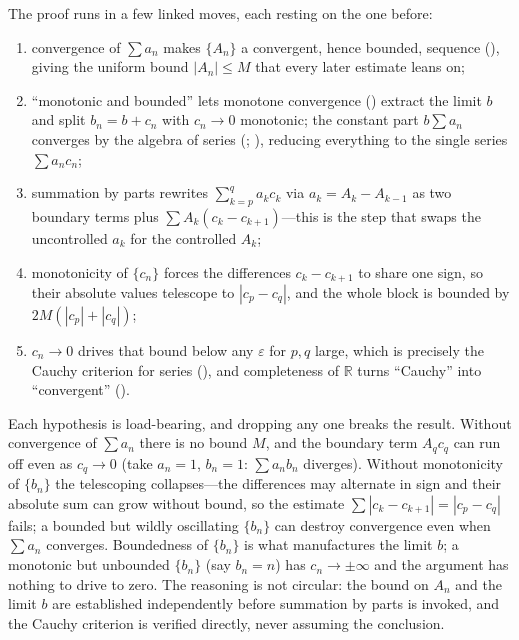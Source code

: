 \documentclass[main.tex]{subfiles}
\begin{document}
\begin{Reflection}
The proof runs in a few linked moves, each resting on the one before:
\begin{enumerate}[leftmargin=1.7em,itemsep=3pt,topsep=2pt,label=\textnormal{(\arabic*)}]
  \item convergence of $\sum a_{n}$ makes $\{A_{n}\}$ a convergent, hence bounded, sequence
        (), giving the uniform bound
        $|A_{n}|\le M$ that every later estimate leans on;
  \item ``monotonic and bounded'' lets monotone convergence () extract the limit $b$ and
        split $b_{n}=b+c_{n}$ with $c_{n}\to 0$ monotonic; the constant part $b\sum a_{n}$ converges by
        the algebra of series (;
        ), reducing everything to the single series $\sum a_{n}c_{n}$;
  \item summation by parts rewrites $\sum_{k=p}^{q}a_{k}c_{k}$ via $a_{k}=A_{k}-A_{k-1}$ as two
        boundary terms plus $\sum A_{k}(c_{k}-c_{k+1})$---this is the step that swaps the uncontrolled
        $a_{k}$ for the controlled $A_{k}$;
  \item monotonicity of $\{c_{n}\}$ forces the differences $c_{k}-c_{k+1}$ to share one sign, so their
        absolute values telescope to $|c_{p}-c_{q}|$, and the whole block is bounded by
        $2M(|c_{p}|+|c_{q}|)$;
  \item $c_{n}\to 0$ drives that bound below any $\varepsilon$ for $p,q$ large, which is precisely the
        Cauchy criterion for series (), and completeness of $\mathbb R$ turns ``Cauchy''
        into ``convergent'' ().
\end{enumerate}

Each hypothesis is load-bearing, and dropping any one breaks the result. Without convergence of
$\sum a_{n}$ there is no bound $M$, and the boundary term $A_{q}c_{q}$ can run off even as $c_{q}\to 0$
(take $a_{n}=1$, $b_{n}=1$: $\sum a_{n}b_{n}$ diverges). Without monotonicity of $\{b_{n}\}$ the
telescoping collapses---the differences may alternate in sign and their absolute sum can grow without
bound, so the estimate $\sum|c_{k}-c_{k+1}|=|c_{p}-c_{q}|$ fails; a bounded but wildly oscillating
$\{b_{n}\}$ can destroy convergence even when $\sum a_{n}$ converges. Boundedness of $\{b_{n}\}$ is
what manufactures the limit $b$; a monotonic but unbounded $\{b_{n}\}$ (say $b_{n}=n$) has $c_{n}\to
\pm\infty$ and the argument has nothing to drive to zero. The reasoning is not circular: the bound on
$A_{n}$ and the limit $b$ are established independently before summation by parts is invoked, and the
Cauchy criterion is verified directly, never assuming the conclusion.


\end{Reflection}
\end{document}
